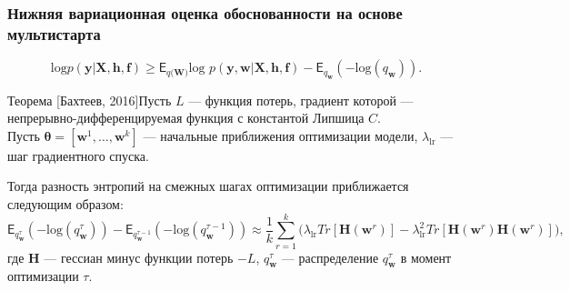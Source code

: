 \documentclass[usenames,dvipsnames,11pt,pdf,utf8,russian,aspectratio=43]{beamer}
\begin{document}
\begin{frame}
\small
\frametitle{Нижняя вариационная оценка обоснованности на основе мультистарта}
$$\text{log}p(\mathbf{y}|\mathbf{X}, \mathbf{h},\mathbf{f}) \geq \mathsf{E}_{q(\mathbf{W)}}\text{log~}p (\mathbf{y}, \mathbf{w}|\mathbf{X}, \mathbf{h},\mathbf{f}) - \mathsf{E}_{q_{\mathbf{w}}}(-\text{log}(q_\mathbf{w})).$$

\begin{block}{Теорема [Бахтеев, 2016]}Пусть $L$ --- функция потерь, градиент которой ---  непрерывно-дифференцируемая функция с константой Липшица $C$. \\
Пусть $\boldsymbol{\theta} = [\mathbf{w}^1,\dots,\mathbf{w}^k]$ ---  начальные приближения оптимизации модели, $\lambda_\text{lr}$ --- шаг градиентного спуска.

Тогда разность энтропий на смежных шагах оптимизации приближается следующим образом:
\small
\[
	\mathsf{E}_{q^{\tau}_{\mathbf{w}}}(-\text{log}(q^{\tau}_\mathbf{w})) -  \mathsf{E}_{q^{\tau-1}_{\mathbf{w}}}(-\text{log}(q^{\tau-1}_\mathbf{w}))  \approx  \frac{1}{k}\sum_{r=1}^k \bigl(\lambda_\text{lr} Tr[\mathbf{H}(\mathbf{w}^r)] - \lambda_\text{lr}^2 Tr[\mathbf{H}(\mathbf{w}^r)\mathbf{H}(\mathbf{w}^r)]  \bigr),
\]
где $\mathbf{H}$ --- гессиан минус функции потерь $-L$, $q^{\tau}_\mathbf{w}$ --- распределение $q^{\tau}_\mathbf{w}$ в момент оптимизации $\tau$.
\end{block}
\end{frame}
\end{document}
